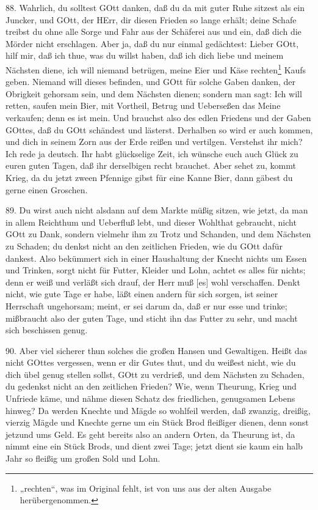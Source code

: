 88. Wahrlich, du solltest GOtt danken, daß du da mit guter Ruhe sitzest als ein Juncker, und GOtt, der HErr, dir diesen Frieden so lange erhält; deine Schafe treibst du ohne alle Sorge und Fahr aus der Schäferei aus und ein, daß dich die Mörder nicht erschlagen. Aber ja, daß du nur einmal gedächtest: Lieber GOtt, hilf mir, daß ich thue, was du willst haben, daß ich dich liebe und meinem Nächsten diene, ich will niemand betrügen, meine Eier und Käse rechten\footnote{„rechten“, was im Original fehlt, ist von uns aus der alten Ausgabe herübergenommen.} Kaufs geben. Niemand will dieses befinden, und GOtt für solche Gaben danken, der Obrigkeit gehorsam sein, und dem Nächsten dienen; sondern man sagt: Ich will retten, saufen mein Bier, mit Vortheil, Betrug und Ueberseßen das Meine verkaufen; denn es ist mein. Und brauchst also des edlen Friedens und der Gaben GOttes, daß du GOtt schändest und lästerst. Derhalben so wird er auch kommen, und dich in seinem Zorn aus der Erde reißen und vertilgen. Verstehst ihr mich? Ich rede ja deutsch. Ihr habt glückselige Zeit, ich wünsche euch auch Glück zu euren guten Tagen, daß ihr derselbigen recht brauchet. Aber sehet zu, kommt Krieg, da du jetzt zween Pfennige gibst für eine Kanne Bier, dann gäbest du gerne einen Groschen.

89. Du wirst auch nicht alsdann auf dem Markte müßig sitzen, wie jetzt, da man in allem Reichthum und Ueberfluß lebt, und dieser Wohlthat gebraucht, nicht GOtt zu Dank, sondern vielmehr ihm zu Trotz und Schanden, und dem Nächsten zu Schaden; du denkst nicht an den zeitlichen Frieden, wie du GOtt dafür dankest. Also bekümmert sich in einer Haushaltung der Knecht nichts um Essen und Trinken, sorgt nicht für Futter, Kleider und Lohn, achtet es alles für nichts; denn er weiß und verläßt sich drauf,
der Herr muß [es] wohl verschaffen. Denkt nicht, wie gute Tage er habe, läßt einen andern für sich sorgen, ist seiner Herrschaft ungehorsam; meint, er sei darum da, daß er nur esse und trinke; mißbraucht also der guten Tage, und sticht ihn das Futter zu sehr, und macht sich beschissen genug.

90. Aber viel sicherer thun solches die großen Hansen und Gewaltigen. Heißt das nicht GOttes vergessen, wenn er dir Gutes thut, und du weißest nicht, wie du dich übel genug stellen sollst, GOtt zu verdrieß, und dem Nächsten zu Schaden, du gedenkst nicht an den zeitlichen Frieden? Wie, wenn Theurung, Krieg und Unfriede käme, und nähme diesen Schatz des friedlichen, genugsamen Lebens hinweg? Da werden Knechte und Mägde so wohlfeil werden, daß zwanzig, dreißig, vierzig Mägde und Knechte gerne um ein Stück Brod fleißiger dienen, denn sonst jetzund ums Geld. Es geht bereits also an andern Orten, da Theurung ist, da nimmt eine ein Stück Brods, und dient zwei Tage; jetzt dient sie kaum ein halb Jahr so fleißig um großen Sold und Lohn.

